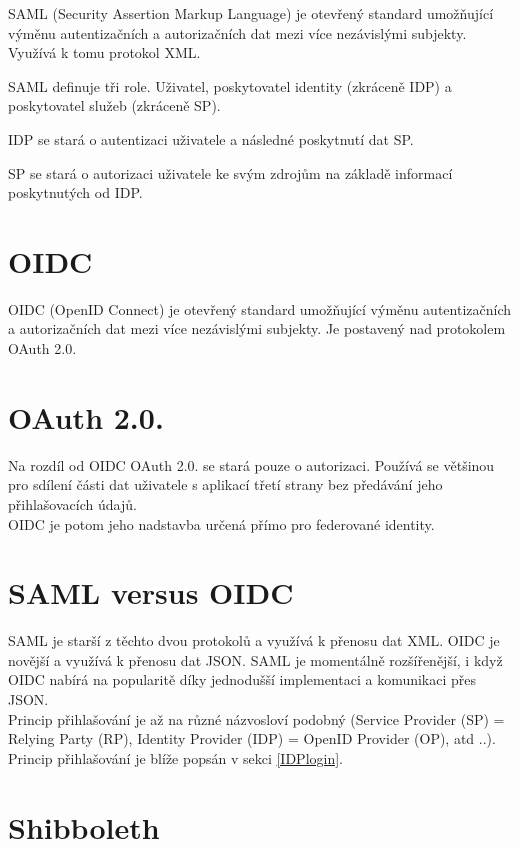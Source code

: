 SAML\cite{SAMLofficialSite}\cite{WhatIsSaml} (Security Assertion Markup Language) je otevřený standard umožňující výměnu autentizačních a autorizačních dat mezi více nezávislými subjekty. Využívá k tomu protokol XML. 

SAML definuje tři role. Uživatel, poskytovatel identity (zkráceně IDP) a poskytovatel služeb (zkráceně SP). 

IDP se stará o autentizaci uživatele a následné poskytnutí dat SP.

SP se stará o autorizaci uživatele ke svým zdrojům na základě informací poskytnutých od IDP.

\section{OIDC}

OIDC (OpenID Connect) je otevřený standard umožňující výměnu autentizačních a autorizačních dat mezi více nezávislými subjekty. Je postavený nad protokolem OAuth 2.0.\cite{OIDC}

\section{OAuth 2.0.}
Na rozdíl od OIDC OAuth 2.0. se stará pouze o autorizaci. Používá se většinou pro sdílení části dat uživatele s aplikací třetí strany bez předávání jeho přihlašovacích údajů. \\
OIDC je potom jeho nadstavba určená přímo pro federované identity. \cite{OAUTHvSAMLvOIDC}

\section{SAML versus OIDC}

SAML je starší z těchto dvou protokolů a využívá k přenosu dat XML. OIDC je novější a využívá k přenosu dat JSON. 
SAML je momentálně rozšířenější, i když OIDC nabírá na popularitě díky jednodušší implementaci a komunikaci přes JSON.\cite{SAMLxOIDC} \\
Princip přihlašování je až na různé názvosloví podobný (Service Provider (SP) = Relying Party (RP),  Identity Provider (IDP) = OpenID Provider (OP), atd ..).
Princip přihlašování je blíže popsán v sekci \ref{IDPlogin}.

\section{Shibboleth}

